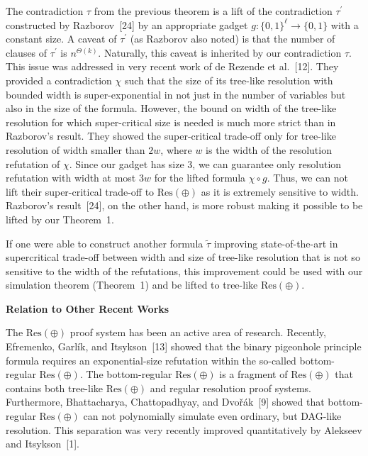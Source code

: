 \documentclass[10pt,a4paper]{article}
\begin{document}
The contradiction $\tau$ from the previous theorem is a lift of the contradiction $\tau^{\prime}$ constructed by Razborov [24] by an appropriate gadget $g:\{0,1\}^{\ell}\to\{0,1\}$ with a constant size.
A caveat of $\tau^{\prime}$ (as Razborov also noted) is that the number of clauses of $\tau^{\prime}$ is $n^{\Theta(k)}$.
Naturally, this caveat is inherited by our contradiction $\tau$.
This issue was addressed in very recent work of de Rezende et al. [12].
They provided a contradiction $\chi$ such that the size of its tree-like resolution with bounded width is super-exponential in not just in the number of variables but also in the size of the formula.
However, the bound on width of the tree-like resolution for which super-critical size is needed is much more strict than in Razborov’s result.
They showed the super-critical trade-off only for tree-like resolution of width smaller than $2w$, where $w$ is the width of the resolution refutation of $\chi$.
Since our gadget has size 3, we can guarantee only resolution refutation with width at most $3w$ for the lifted formula $\chi\circ g$.
Thus, we can not lift their super-critical trade-off to $\text{Res}(\oplus)$ as it is extremely sensitive to width.
Razborov’s result [24], on the other hand, is more robust making it possible to be lifted by our Theorem 1.\par




If one were able to construct another formula $\tilde{\tau}$ improving state-of-the-art in supercritical trade-off between width and size of tree-like resolution that is not so sensitive to the width of the refutations, this improvement could be used with our simulation theorem (Theorem 1) and be lifted to tree-like $\text{Res}(\oplus)$.\par




\par\medskip\noindent\textbf{Relation to Other Recent Works}\par




The $\text{Res}(\oplus)$ proof system has been an active area of research.
Recently, Efremenko, Garlík, and Itsykson [13] showed that the binary pigeonhole principle formula requires an exponential-size refutation within the so-called bottom-regular $\text{Res}(\oplus)$.
The bottom-regular $\text{Res}(\oplus)$ is a fragment of $\text{Res}(\oplus)$ that contains both tree-like $\text{Res}(\oplus)$ and regular resolution proof systems.
Furthermore, Bhattacharya, Chattopadhyay, and Dvořák [9] showed that bottom-regular $\text{Res}(\oplus)$ can not polynomially simulate even ordinary, but DAG-like resolution.
This separation was very recently improved quantitatively by Alekseev and Itsykson [1].\par
\end{document}
